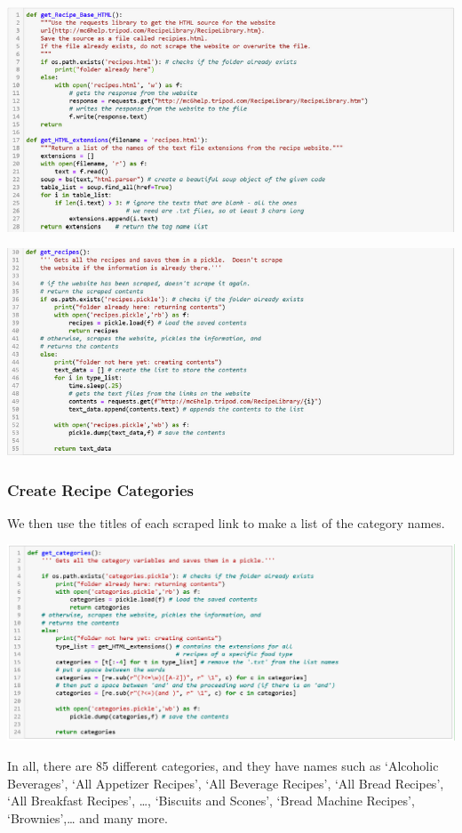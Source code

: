 \documentclass[11pt]{article}
\makeatletter
\def\maxwidth{\ifdim\Gin@nat@width>\linewidth\linewidth
    \else\Gin@nat@width\fi}
\let\Oldincludegraphics\includegraphics
\renewcommand{\includegraphics}[1]{\Oldincludegraphics[width=.8\maxwidth]{#1}}
\makeatother
\begin{document}
\includegraphics{split1.png}

    \includegraphics{split2.png}

    \hypertarget{create-recipe-categories}{%
\subsubsection{Create Recipe
Categories}\label{create-recipe-categories}}

We then use the titles of each scraped link to make a list of the
category names.

\includegraphics{find_rcategories_code.png}

In all, there are 85 different categories, and they have names such as
`Alcoholic Beverages', `All Appetizer Recipes', `All Beverage Recipes',
`All Bread Recipes', `All Breakfast Recipes', \ldots{}, `Biscuits and
Scones', `Bread Machine Recipes', `Brownies',\ldots{} and many more.
\end{document}
